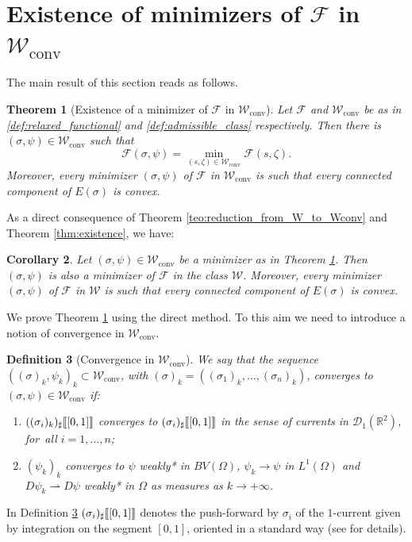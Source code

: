 \documentclass[JEP,XML,SOM,Unicode, NoFloatCountersInSection,published]{cedram}
\newcommand{\R}{\mathbb{R}}
\newcommand{\largercomp}{\mathcal W}
\let\sigmamin\sigma
\let\psimin\psi
\newcommand\admclassconv{{\mathcal W_\mathrm{conv}}}
\newcommand{\jump}[1]{\textup{\textlbrackdbl}{#1}\textup{\textrbrackdbl}}
\newtheorem{theorem}{Theorem}[section]
\newtheorem{definition}[theorem]{Definition}
\newtheorem{cor}[theorem]{Corollary}
\theoremstyle{definition}
\begin{document}
\section{Existence of minimizers of \texorpdfstring{$\mathcal F$ in $\admclassconv$}{FW}}

\label{sec:existence_of_minimizers_of_F_in_Wconv}
The main result of this section reads as follows.

\begin{theorem}[Existence of a minimizer of $\mathcal F$ in $\admclassconv$]\label{thm:existence}
Let $\mathcal F$ and $\admclassconv$ be as in \eqref{def:relaxed_functional}
and \eqref{def:admissible_class} respectively. Then there
is $(\sigma, \psi)\in\admclassconv$ such that
\begin{equation}\label{eq:min_F_storto}
\mathcal F(\sigma,\psi)=
\min_{(s,\zeta)\in\admclassconv}\mathcal F(s,\zeta).
\end{equation}
Moreover, every minimizer $(\sigma, \psi)$ of $\mathcal F$ in $\admclassconv$ is such that every connected component of $E(\sigma)$ is convex.
\end{theorem}
As a direct consequence of Theorem \ref{teo:reduction_from_W_to_Wconv} and Theorem \eqref{thm:existence}, we have:

\begin{cor}\label{cor:mininmathcalW}
Let $(\sigmamin,\psimin)\in\admclassconv$ be a minimizer as in Theorem \ref{thm:existence}. Then $(\sigmamin,\psimin)$ is also a minimizer of ${\mathcal F}$ in the class $\largercomp$. Moreover, every minimizer $(\sigma, \psi)$ of $\mathcal F$ in $\mathcal W$ is such that every connected component of $E(\sigma)$ is convex.
\end{cor}

We prove Theorem \ref{thm:existence} using the direct method. To this aim
we need to introduce a notion of convergence in $\admclassconv$.
\begin{definition}[Convergence in $\admclassconv$]
\label{def:conv}
We say that the sequence $((\sigma)_k,\psi_k)_k\subset \admclassconv
$, with $(\sigma)_k=((\sigma_1)_k,\dots,(\sigma_n)_k)$, converges to $(\sigma,\psi)\in \admclassconv$ if:
\begin{enumerate}[{\rm (a)},wide]
\item\label{a}
$((\sigma_{i})_k)_\sharp\jump{[0,1]}$ converges to
$(\sigma_i)_\sharp \jump{[0,1]}$ in the sense of currents in $\mathcal D_1(\R^2)$,
for~all $i=1,\dots,n$;
\item \label{b} $(\psi_k)_k$ converges
to $\psi$ weakly* in $BV(\Omega)$, \ie $\psi_k \to \psi$ in $L^1(\Omega)$ and
$D \psi_k \rightharpoonup D\psi$ weakly* in $\Omega$
as measures as
$k \to +\infty$.
\end{enumerate}
\end{definition}
In Definition \ref{def:conv} $(\sigma_i)_\sharp\jump{[0,1]}$ denotes the push-forward by $\sigma_i$ of the $1$-current given by integration on the segment $[0,1]$, oriented in a standard way (see \cite{Krantz-Parks} for details).
\end{document}
